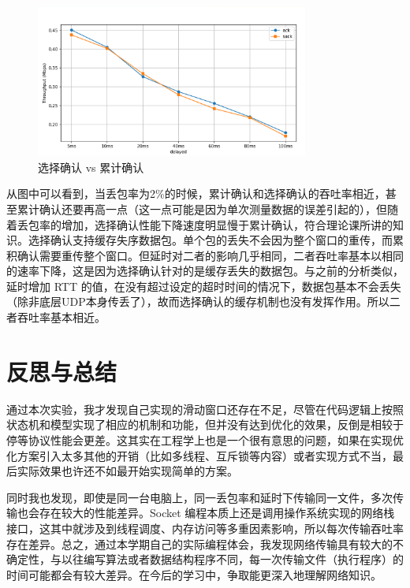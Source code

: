 \documentclass[UTF8,a4paper,10pt]{ctexart}
\begin{document}
\begin{figure}[H]
    \centering
\includegraphics[width=0.8\textwidth]{img/p3-2.png}
    \caption{选择确认 vs 累计确认}
\end{figure}
从图中可以看到，当丢包率为2\%的时候，累计确认和选择确认的吞吐率相近，甚至累计确认还要再高一点（这一点可能是因为单次测量数据的误差引起的），但随着丢包率的增加，选择确认性能下降速度明显慢于累计确认，符合理论课所讲的知识。选择确认支持缓存失序数据包。单个包的丢失不会因为整个窗口的重传，而累积确认需要重传整个窗口。但延时对二者的影响几乎相同，二者吞吐率基本以相同的速率下降，这是因为选择确认针对的是缓存丢失的数据包。与之前的分析类似，延时增加 RTT 的值，在没有超过设定的超时时间的情况下，数据包基本不会丢失（除非底层UDP本身传丢了），故而选择确认的缓存机制也没有发挥作用。所以二者吞吐率基本相近。


\section{反思与总结}
通过本次实验，我才发现自己实现的滑动窗口还存在不足，尽管在代码逻辑上按照状态机和模型实现了相应的机制和功能，但并没有达到优化的效果，反倒是相较于停等协议性能会更差。这其实在工程学上也是一个很有意思的问题，如果在实现优化方案引入太多其他的开销（比如多线程、互斥锁等内容）或者实现方式不当，最后实际效果也许还不如最开始实现简单的方案。\par
同时我也发现，即使是同一台电脑上，同一丢包率和延时下传输同一文件，多次传输也会存在较大的性能差异。Socket 编程本质上还是调用操作系统实现的网络栈接口，这其中就涉及到线程调度、内存访问等多重因素影响，所以每次传输吞吐率存在差异。总之，通过本学期自己的实际编程体会，我发现网络传输具有较大的不确定性，与以往编写算法或者数据结构程序不同，每一次传输文件（执行程序）的时间可能都会有较大差异。在今后的学习中，争取能更深入地理解网络知识。
\end{document}
